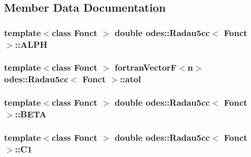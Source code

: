 \subsection{Member Data Documentation}
\hypertarget{classodes_1_1Radau5cc_a42e13c53f1b12eee97f358a2913f8e4f}{}
\subsubsection[{A\+L\+P\+H}]{\setlength{\rightskip}{0pt plus 5cm}template$<$class Fonct $>$ double {\bf odes\+::\+Radau5cc}$<$ Fonct $>$\+::A\+L\+P\+H\hspace{0.3cm}{\ttfamily [private]}}\label{classodes_1_1Radau5cc_a42e13c53f1b12eee97f358a2913f8e4f}
\hypertarget{classodes_1_1Radau5cc_a4a905596498d2d8ab9f46201d54eaa4d}{}
\subsubsection[{atol}]{\setlength{\rightskip}{0pt plus 5cm}template$<$class Fonct $>$ {\bf fortran\+Vector\+F}$<${\bf n}$>$ {\bf odes\+::\+Radau5cc}$<$ Fonct $>$\+::atol\hspace{0.3cm}{\ttfamily [private]}}\label{classodes_1_1Radau5cc_a4a905596498d2d8ab9f46201d54eaa4d}
\hypertarget{classodes_1_1Radau5cc_aca32380625f370758068d4c225958cd1}{}
\subsubsection[{B\+E\+T\+A}]{\setlength{\rightskip}{0pt plus 5cm}template$<$class Fonct $>$ double {\bf odes\+::\+Radau5cc}$<$ Fonct $>$\+::B\+E\+T\+A\hspace{0.3cm}{\ttfamily [private]}}\label{classodes_1_1Radau5cc_aca32380625f370758068d4c225958cd1}
\hypertarget{classodes_1_1Radau5cc_ad1df67bebb6c9753e789643dbbac4b64}{}
\subsubsection[{C1}]{\setlength{\rightskip}{0pt plus 5cm}template$<$class Fonct $>$ double {\bf odes\+::\+Radau5cc}$<$ Fonct $>$\+::C1\hspace{0.3cm}{\ttfamily [private]}}\label{classodes_1_1Radau5cc_ad1df67bebb6c9753e789643dbbac4b64}
\hypertarget{classodes_1_1Radau5cc_a1cf578a3f19e8e43321e182c46f710f4}{}
